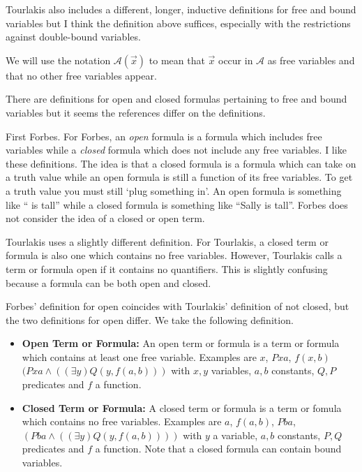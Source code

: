 \documentclass[12pt]{article}
\newcommand{\mc}[1]{\mathcal{#1}}
\begin{document}
Tourlakis also includes a different, longer, inductive definitions for free and bound variables but I think the definition above suffices, especially with the restrictions against double-bound variables.

We will use the notation $\mc{A}(\vec{x})$ to mean that $\vec{x}$ occur in $\mc{A}$ as free variables and that no other free variables appear.

There are definitions for open and closed formulas pertaining to free and bound variables but it seems the references differ on the definitions.

First Forbes. For Forbes, an \textit{open} formula is a formula which includes free variables while a \textit{closed} formula which does not include any free variables. I like these definitions. The idea is that a closed formula is a formula which can take on a truth value while an open formula is still a function of its free variables. To get a truth value you must still `plug something in'. An open formula is something like ``\underline{\hspace{0.75cm}} is tall'' while a closed formula is something like ``Sally is tall''. Forbes does not consider the idea of a closed or open term.

Tourlakis uses a slightly different definition. For Tourlakis, a closed term or formula is also one which contains no free variables. However, Tourlakis calls a term or formula open if it contains no quantifiers. This is slightly confusing because a formula can be both open and closed. 

Forbes' definition for open coincides with Tourlakis' definition of not closed, but the two definitions for open differ. We take the following definition.

\hrulefill
\begin{itemize}
\item{\textbf{Open Term or Formula:} An open term or formula is a term or formula which contains at least one free variable. Examples are $x$, $Pxa$, $f(x,b)$ $(Pxa \land ((\exists y) Q(y,f(a,b)))$ with $x,y$ variables, $a,b$ constants, $Q,P$ predicates and $f$ a function.}
\item{\textbf{Closed Term or Formula:} A closed term or formula is a term or fomula which contains no free variables. Examples are $a$, $f(a,b)$, $Pba$, $(Pba \land ((\exists y)Q(y,f(a,b))))$ with $y$ a variable, $a,b$ constants, $P,Q$ predicates and $f$ a function. Note that a closed formula can contain bound variables.}
\end{itemize}
\hrulefill
\end{document}
